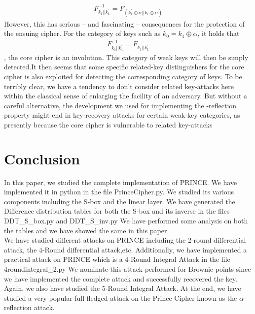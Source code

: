 \documentclass{transcrypto}
\begin{document}
\begin{align*}
    F^{-1}_{k_{1}||k_{1}^{'}}=F_{(k_{1}^{'} \oplus \alpha|| k_{1} \oplus \alpha)}
\end{align*}
However, this has serious – and fascinating – consequences for the protection of the ensuing cipher. For the category of keys such as $k_{0}=k_{1} \oplus \alpha$, it holds that
\begin{align*}
    F^{-1}_{k_{1}||k_{1}^{'}}=F_{k_{1}||k_{1}^{'}}
\end{align*}
 , the core cipher is an involution. This category of weak keys will then be simply detected.It then seems that some specific related-key distinguishers for the core cipher is also exploited for detecting the corresponding category of keys. To be terribly clear, we have a tendency to don't consider related key-attacks here within the classical sense of enlarging the facility of an adversary. But without a careful alternative, the development we used for implementing the -reflection property might end in key-recovery attacks for certain weak-key categories, as presently because the core cipher is vulnerable to related key-attacks
\section{Conclusion}
In this paper, we studied the complete implementation of PRINCE. We have implemented it in python in the file PrinceCipher.py. 
We studied its various components including the S-box and the linear layer. 
We have generated the Difference distribution tables for both the S-box and its inverse in the files DDT\_S\_box.py and DDT\_S\_inv.py 
We have performed some analysis on both the tables and we have showed the same in this paper.\\
We have studied different attacks on PRINCE including the 2-round differential attack, the 4-Round differential attack,etc.
Additionally, we have implemented a practical attack on PRINCE which is a 4-Round Integral Attack in the file 4roundintegral\_2.py 
We nominate this attack performed for Brownie points since we have implemented the complete attack and successfully recovered the key.
Again, we also have studied the 5-Round Integral Attack. 
At the end, we have studied a very popular full fledged attack on the Prince Cipher known as the $\alpha$-reflection attack. 
\end{document}
